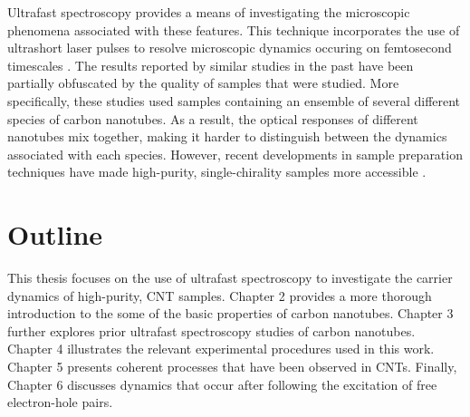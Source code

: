 Ultrafast spectroscopy provides a means of investigating the microscopic phenomena associated with these features. This technique incorporates the use of ultrashort laser pulses to resolve microscopic dynamics occuring on femtosecond timescales \cite{shah1996ultrafast}. The results reported by similar studies in the past have been partially obfuscated by the quality of samples that were studied. More specifically, these studies used samples containing an ensemble of several different species of carbon nanotubes. As a result, the optical responses of different nanotubes mix together, making it harder to distinguish between the dynamics associated with each species. However, recent developments in sample preparation techniques have made high-purity, single-chirality samples more accessible \cite{ichinose2017extraction}. 


\section{Outline}

This thesis focuses on the use of ultrafast spectroscopy to investigate the carrier dynamics of high-purity, CNT samples. Chapter 2 provides a more thorough introduction to the some of the basic properties of carbon nanotubes. Chapter 3 further explores prior ultrafast spectroscopy studies of carbon nanotubes. Chapter 4 illustrates the relevant experimental procedures used in this work. Chapter 5 presents coherent processes that have been observed in CNTs. Finally, Chapter 6 discusses dynamics that occur after following the excitation of free electron-hole pairs.	